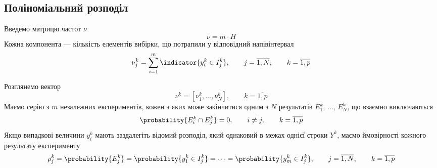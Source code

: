 \subsection{Поліноміальний розподіл}
Введемо матрицю частот $\nu$
\begin{equation*}
  \nu = m \cdot H
\end{equation*}
Кожна компонента --- кількість елементів вибірки, що потрапили у відповідний
напівінтервал
\begin{equation*}
  \nu_j^k = \sum_{i=1}^{m} \indicator{y_i^k \in I_j^k},
  \qquad j = \overline{1, N},
  \qquad k = \overline{1, p}
\end{equation*}

Розглянемо вектор
\begin{equation*}
  \nu^k = \left[ \nu_1^k, \dots, \nu_N^k \right],
  \qquad k = \overline{1,p}
\end{equation*}
Маємо серію з $m$ незалежних експериментів, кожен з яких може закінчитися
одним з $N$ результатів $E_1^k$, $\dots$, $E_N^k$, що взаємно виключаються
\begin{equation*}
  \probability{E_i^k \cap E_j^k} = 0,
  \qquad i \neq j,
  \qquad k = \overline{1,p}
\end{equation*}
Якщо випадкові величини $y_i^k$ мають заздалегіть відомий
розподіл, який однаковий в межах однієї строки $Y^k$, маємо ймовірності
кожного результату експерименту
\begin{equation*}
  \rho_j^k = \probability{E_j^k} = \probability{y_1^k \in I_j^k}
  = \dots = \probability{y_m^k \in I_j^k},
  \qquad j = \overline{1,N},
  \qquad k = \overline{1,p}
\end{equation*}

